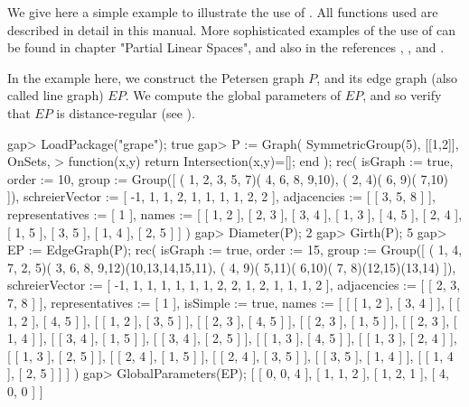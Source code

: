 
We give here a simple example to illustrate the use of {\GRAPE}. All
functions used are described in detail in this manual. More
sophisticated examples of the use of {\GRAPE} can be found in
chapter "Partial Linear Spaces", and also in the references \cite{Cam99},
\cite{CSS99}, \cite{HL99} and \cite{Soi06}.

In the example here, we construct the Petersen graph $P$, and its edge
graph (also called line graph) $EP$. We compute the global parameters
of $EP$, and so verify that $EP$ is distance-regular (see \cite{BCN89}).

\beginexample
gap> LoadPackage("grape");
true
gap> P := Graph( SymmetricGroup(5), [[1,2]], OnSets,
>             function(x,y) return Intersection(x,y)=[]; end );
rec( isGraph := true, order := 10, 
  group := Group([ ( 1, 2, 3, 5, 7)( 4, 6, 8, 9,10), ( 2, 4)( 6, 9)( 7,10) ]),
  schreierVector := [ -1, 1, 1, 2, 1, 1, 1, 1, 2, 2 ], 
  adjacencies := [ [ 3, 5, 8 ] ], representatives := [ 1 ], 
  names := [ [ 1, 2 ], [ 2, 3 ], [ 3, 4 ], [ 1, 3 ], [ 4, 5 ], [ 2, 4 ], 
      [ 1, 5 ], [ 3, 5 ], [ 1, 4 ], [ 2, 5 ] ] )
gap> Diameter(P);
2
gap> Girth(P);
5
gap> EP := EdgeGraph(P);
rec( isGraph := true, order := 15, 
  group := Group([ ( 1, 4, 7, 2, 5)( 3, 6, 8, 9,12)(10,13,14,15,11), 
      ( 4, 9)( 5,11)( 6,10)( 7, 8)(12,15)(13,14) ]), 
  schreierVector := [ -1, 1, 1, 1, 1, 1, 1, 2, 2, 1, 2, 1, 1, 1, 2 ], 
  adjacencies := [ [ 2, 3, 7, 8 ] ], representatives := [ 1 ], 
  isSimple := true, 
  names := [ [ [ 1, 2 ], [ 3, 4 ] ], [ [ 1, 2 ], [ 4, 5 ] ], 
      [ [ 1, 2 ], [ 3, 5 ] ], [ [ 2, 3 ], [ 4, 5 ] ], [ [ 2, 3 ], [ 1, 5 ] ], 
      [ [ 2, 3 ], [ 1, 4 ] ], [ [ 3, 4 ], [ 1, 5 ] ], [ [ 3, 4 ], [ 2, 5 ] ], 
      [ [ 1, 3 ], [ 4, 5 ] ], [ [ 1, 3 ], [ 2, 4 ] ], [ [ 1, 3 ], [ 2, 5 ] ], 
      [ [ 2, 4 ], [ 1, 5 ] ], [ [ 2, 4 ], [ 3, 5 ] ], [ [ 3, 5 ], [ 1, 4 ] ], 
      [ [ 1, 4 ], [ 2, 5 ] ] ] )
gap> GlobalParameters(EP);
[ [ 0, 0, 4 ], [ 1, 1, 2 ], [ 1, 2, 1 ], [ 4, 0, 0 ] ]
\endexample
